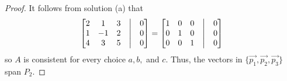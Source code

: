 \documentclass[12pt]{article}
\begin{document}
\begin{enumerate}
\begin{enumerate}
\begin{proof}
                                    It follows from solution (a) that
                                    \begin{align*}
                                            \begin{bmatrix}
                                                    2 & 1  & 3 & \bigm| & 0 \\
                                                    1 & -1 & 2 & \bigm| & 0 \\
                                                    4 & 3  & 5 & \bigm| & 0 \\
                                            \end{bmatrix}
                                            =
                                            \begin{bmatrix}
                                                    1 & 0 & 0 & \bigm| & 0 \\
                                                    0 & 1 & 0 & \bigm| & 0 \\
                                                    0 & 0 & 1 & \bigm| & 0 \\
                                            \end{bmatrix}
                                    \end{align*}
                                    so $A$ is consistent for every choice $a,b,$ and $c$.
                                    Thus, the vectors in $\{\vec{p_{1}},\vec{p_{2}},\vec{p_{3}}\}$ span $P_{2}$.
                            \end{proof}

\end{enumerate}
\end{enumerate}
\end{document}
